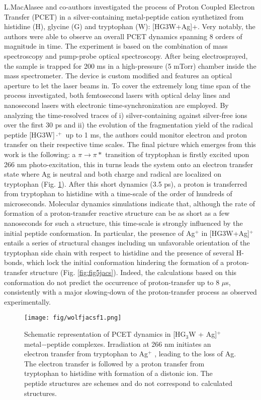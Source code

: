 \documentclass[journal=jacsat,manuscript=article]{achemso}
\begin{document}
L.MacAlasee and co-authors investigated the process of Proton Coupled
Electron Transfer (PCET) in a silver-containing metal-peptide cation
synthetized from histidine (H), glycine (G) and tryptophan (W):
[HG3W+Ag]+. Very notably, the authors were able to observe an overall
PCET dynamics spanning 8 orders of magnitude in time.  The experiment
is based on the combination of mass spectroscopy and pump-probe
optical spectroscopy. After being electrosprayed, the sample is
trapped for 200 ms in a high-pressure (5 mTorr) chamber inside the
mass spectrometer. The device is custom modified and features an
optical aperture to let the laser beams in.  To cover the extremely
long time span of the process investigated, both femtosecond lasers
with optical delay lines and nanosecond lasers with electronic
time-synchronization are employed. By analyzing the time-resolved
traces of i) silver-containing against silver-free ions over the first
30 ps and ii) the evolution of the fragmentation yield of the radical
peptide [HG3W]$\cdot ^+$ up to 1 ms, the authors could monitor
electron and proton transfer on their respective time scales. The
final picture which emerges from this work is the following: a $\pi
\rightarrow \pi*$ transition of tryptophan is firstly excited upon 266
nm photo-excitation, this in turns leads the system onto an electron
transfer state where Ag is neutral and both charge and radical are
localized on tryptophan (Fig. \ref{fig:fig1jacs}). After this short
dynamics (3.5 ps), a proton is transferred from tryptophan to
histidine with a time-scale of the order of hundreds of
microseconds. Molecular dynamics simulations indicate that, although
the rate of formation of a proton-transfer reactive structure can be
as short as a few nanoseconds for such a structure, this time-scale is
strongly influenced by the initial peptide conformation. In
particular, the presence of Ag$^+$ in [HG3W+Ag]$^+$ entails a series
of structural changes including un unfavorable orientation of the
tryptophan side chain with respect to histidine and the presence of
several H-bonds, which lock the initial conformation hindering the
formation of a proton-transfer structure
(Fig. \ref{fig:fig5jacs}). Indeed, the calculations based on this
conformation do not predict the occurrence of proton-transfer up to 8
$\mu$s, consistently with a major slowing-down of the proton-transfer
process as observed experimentally.



\begin{figure}[t]
\centering
\texttt{[image: fig/wolfjacsf1.png]}
\caption{Schematic representation of PCET dynamics in [HG$_3$W +
    Ag]$^+$ metal−peptide complexes. Irradiation at 266 nm initiates
  an electron transfer from tryptophan to Ag$^+$ , leading to the loss
  of Ag.  The electron transfer is followed by a proton transfer from
  tryptophan to histidine with formation of a distonic ion. The
  peptide structures are schemes and do not correspond to calculated
  structures.}
\label{fig:fig1jacs}
\end{figure}
\end{document}
